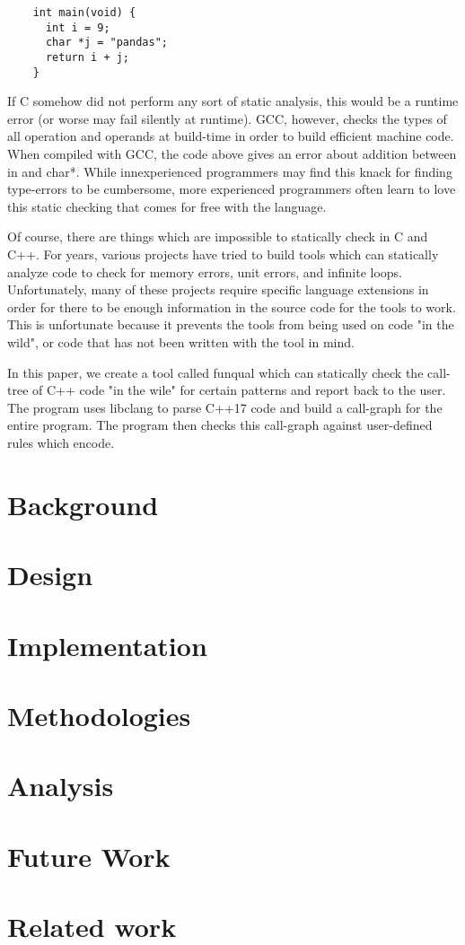 \documentclass{article}
\begin{document}
  \begin{lstlisting}
    int main(void) {
      int i = 9;
      char *j = "pandas";
      return i + j;
    }
  \end{lstlisting}

  If C somehow did not perform any sort of static analysis, this would be a runtime error (or worse may fail silently at runtime).  GCC, however, checks the types of all operation and operands at build-time in order to build efficient machine code.  When compiled with GCC, the code above gives an error about addition between in and char*.  While innexperienced programmers may find this knack for finding type-errors to be cumbersome, more experienced programmers often learn to love this static checking that comes for free with the language.

  Of course, there are things which are impossible to statically check in C and C++.  For years, various projects have tried to build tools which can statically analyze code to check for memory errors, unit errors, and infinite loops.  Unfortunately, many of these projects require specific language extensions in order for there to be enough information in the source code for the tools to work.  This is unfortunate because it prevents the tools from being used on code "in the wild", or code that has not been written with the tool in mind.

  In this paper, we create a tool called funqual which can statically check the call-tree of C++ code "in the wile" for certain patterns and report back to the user.  The program uses libclang to parse C++17 code and build a call-graph for the entire program.  The program then checks this call-graph against user-defined rules which encode.

  \section{Background}

  \section{Design}

  \section{Implementation}

  \section{Methodologies}

  \section{Analysis}

  \section{Future Work}

  \section{Related work}

  \newpage

  \onecolumn
  
  
\end{document}
